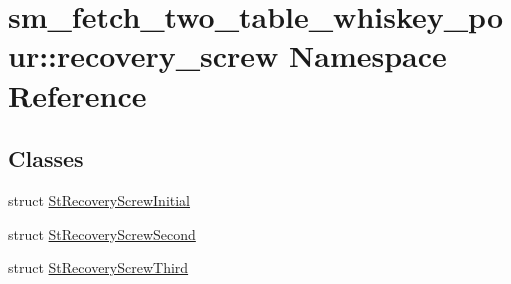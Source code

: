 \hypertarget{namespacesm__fetch__two__table__whiskey__pour_1_1recovery__screw}{}\section{sm\+\_\+fetch\+\_\+two\+\_\+table\+\_\+whiskey\+\_\+pour\+:\+:recovery\+\_\+screw Namespace Reference}
\label{namespacesm__fetch__two__table__whiskey__pour_1_1recovery__screw}
\subsection*{Classes}
\begin{DoxyCompactItemize}
\item 
struct \hyperlink{structsm__fetch__two__table__whiskey__pour_1_1recovery__screw_1_1StRecoveryScrewInitial}{St\+Recovery\+Screw\+Initial}
\item 
struct \hyperlink{structsm__fetch__two__table__whiskey__pour_1_1recovery__screw_1_1StRecoveryScrewSecond}{St\+Recovery\+Screw\+Second}
\item 
struct \hyperlink{structsm__fetch__two__table__whiskey__pour_1_1recovery__screw_1_1StRecoveryScrewThird}{St\+Recovery\+Screw\+Third}
\end{DoxyCompactItemize}
